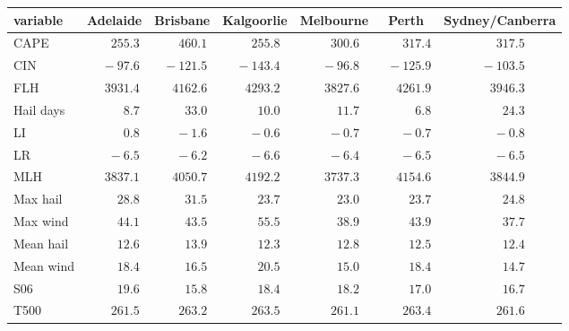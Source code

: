 \begin{tabular}{lcccccc}
\hline
variable  & Adelaide & Brisbane & Kalgoorlie & Melbourne & Perth & \multicolumn{1}{c}{Sydney/Canberra} \\ 
\hline
CAPE  & $\phantom{0}\phantom{-}255.3$ & $\phantom{0}\phantom{-}460.1$ & $\phantom{0}\phantom{-}255.8$ & $\phantom{0}\phantom{-}300.6$ & $\phantom{0}\phantom{-}317.4$ & $\phantom{0}\phantom{-}317.5$ \\
CIN  & $\phantom{00}-97.6$ & $\phantom{0}-121.5$ & $\phantom{0}-143.4$ & $\phantom{00}-96.8$ & $\phantom{0}-125.9$ & $\phantom{0}-103.5$ \\
FLH  & $\phantom{-}3931.4$ & $\phantom{-}4162.6$ & $\phantom{-}4293.2$ & $\phantom{-}3827.6$ & $\phantom{-}4261.9$ & $\phantom{-}3946.3$ \\
Hail days  & $\phantom{000}\phantom{-}8.7$ & $\phantom{00}\phantom{-}33.0$ & $\phantom{00}\phantom{-}10.0$ & $\phantom{00}\phantom{-}11.7$ & $\phantom{000}\phantom{-}6.8$ & $\phantom{00}\phantom{-}24.3$ \\
LI  & $\phantom{000}\phantom{-}0.8$ & $\phantom{000}-1.6$ & $\phantom{000}-0.6$ & $\phantom{000}-0.7$ & $\phantom{000}-0.7$ & $\phantom{000}-0.8$ \\
LR  & $\phantom{000}-6.5$ & $\phantom{000}-6.2$ & $\phantom{000}-6.6$ & $\phantom{000}-6.4$ & $\phantom{000}-6.5$ & $\phantom{000}-6.5$ \\
MLH  & $\phantom{-}3837.1$ & $\phantom{-}4050.7$ & $\phantom{-}4192.2$ & $\phantom{-}3737.3$ & $\phantom{-}4154.6$ & $\phantom{-}3844.9$ \\
Max hail  & $\phantom{00}\phantom{-}28.8$ & $\phantom{00}\phantom{-}31.5$ & $\phantom{00}\phantom{-}23.7$ & $\phantom{00}\phantom{-}23.0$ & $\phantom{00}\phantom{-}23.7$ & $\phantom{00}\phantom{-}24.8$ \\
Max wind  & $\phantom{00}\phantom{-}44.1$ & $\phantom{00}\phantom{-}43.5$ & $\phantom{00}\phantom{-}55.5$ & $\phantom{00}\phantom{-}38.9$ & $\phantom{00}\phantom{-}43.9$ & $\phantom{00}\phantom{-}37.7$ \\
Mean hail  & $\phantom{00}\phantom{-}12.6$ & $\phantom{00}\phantom{-}13.9$ & $\phantom{00}\phantom{-}12.3$ & $\phantom{00}\phantom{-}12.8$ & $\phantom{00}\phantom{-}12.5$ & $\phantom{00}\phantom{-}12.4$ \\
Mean wind  & $\phantom{00}\phantom{-}18.4$ & $\phantom{00}\phantom{-}16.5$ & $\phantom{00}\phantom{-}20.5$ & $\phantom{00}\phantom{-}15.0$ & $\phantom{00}\phantom{-}18.4$ & $\phantom{00}\phantom{-}14.7$ \\
S06  & $\phantom{00}\phantom{-}19.6$ & $\phantom{00}\phantom{-}15.8$ & $\phantom{00}\phantom{-}18.4$ & $\phantom{00}\phantom{-}18.2$ & $\phantom{00}\phantom{-}17.0$ & $\phantom{00}\phantom{-}16.7$ \\
T500  & $\phantom{0}\phantom{-}261.5$ & $\phantom{0}\phantom{-}263.2$ & $\phantom{0}\phantom{-}263.5$ & $\phantom{0}\phantom{-}261.1$ & $\phantom{0}\phantom{-}263.4$ & $\phantom{0}\phantom{-}261.6$ \\
\hline 
\end{tabular}

